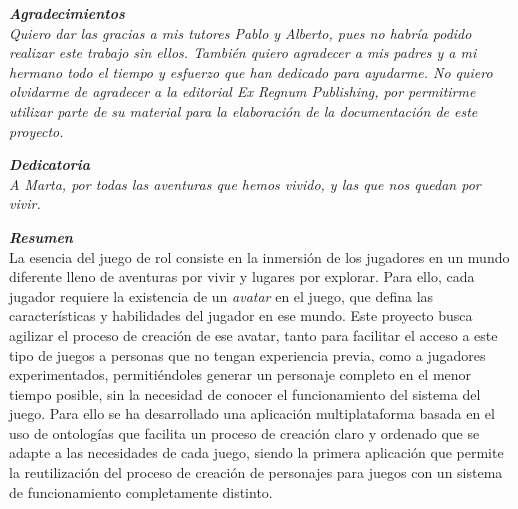 



\thispagestyle{prefacepage}
{\large \textbf{\textit{Agradecimientos}}} 
\vspace{0.5cm} \\
\textit{Quiero dar las gracias a mis tutores Pablo y Alberto, pues no habría podido 
realizar este trabajo sin ellos. También quiero agradecer a mis padres y a mi hermano 
todo el tiempo y esfuerzo que han dedicado para ayudarme. No quiero olvidarme de agradecer a 
la editorial Ex Regnum Publishing, por permitirme utilizar parte de su material 
para la elaboración de la documentación de este proyecto.}

\blankpage{}

\thispagestyle{prefacepage}
{\large \textbf{\textit{Dedicatoria}}} 
\vspace{0.5cm} \\
\textit{A Marta, por todas las aventuras que hemos vivido, y las que nos quedan por vivir.}

\blankpage{}

\thispagestyle{prefacepage}
{\large \textbf{\textit{Resumen}}} 
\vspace{0.5cm} \\
La esencia del juego de rol consiste en la inmersión de los jugadores en un mundo diferente 
lleno de aventuras por vivir y lugares por explorar. Para ello, cada jugador requiere 
la existencia de un \textit{avatar} en el juego, que defina las características y habilidades del 
jugador en ese mundo. Este proyecto busca agilizar el proceso de creación de ese avatar, tanto para 
facilitar el acceso a este tipo de juegos a personas que no tengan experiencia previa, como a jugadores 
experimentados, permitiéndoles generar un personaje completo en el menor tiempo posible, sin la necesidad 
de conocer el funcionamiento del sistema del juego. Para ello se ha desarrollado una aplicación 
multiplataforma basada en el uso de ontologías que facilita un proceso de creación claro y ordenado que se 
adapte a las necesidades de cada juego, siendo la primera aplicación que permite la reutilización del proceso 
de creación de personajes para juegos con un sistema de funcionamiento completamente distinto. 
\vspace{2cm}

